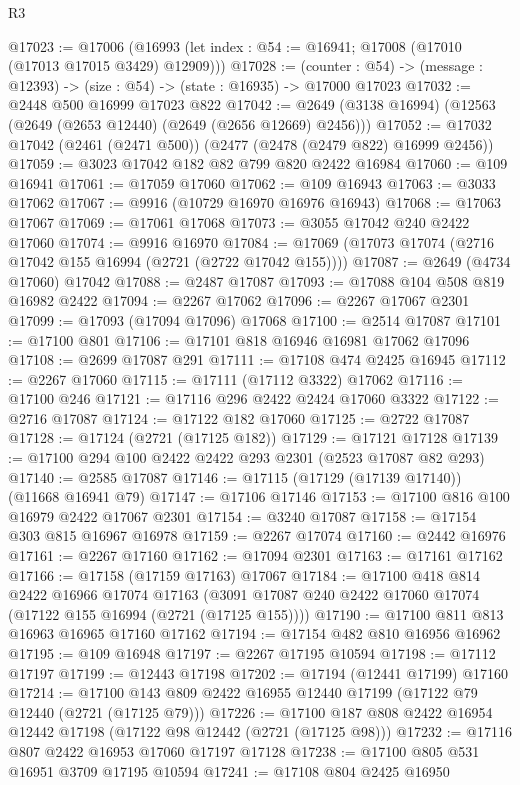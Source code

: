 \begin{lexlean}{R3}
\begin{coremodule}
@17023 := @17006 (@16993 (let index : @54 := @16941; @17008 (@17010 (@17013 @17015 @3429) @12909)))
@17028 := (counter : @54) -> (message : @12393) -> (size : @54) -> (state : @16935) -> @17000 @17023
@17032 := @2448 @500 @16999 @17023 @822
@17042 := @2649 (@3138 @16994) (@12563 (@2649 (@2653 @12440) (@2649 (@2656 @12669) @2456)))
@17052 := @17032 @17042 (@2461 (@2471 @500)) (@2477 (@2478 (@2479 @822) @16999 @2456))
@17059 := @3023 @17042 @182 @82 @799 @820 @2422 @16984
@17060 := @109 @16941
@17061 := @17059 @17060
@17062 := @109 @16943
@17063 := @3033 @17062
@17067 := @9916 (@10729 @16970 @16976 @16943)
@17068 := @17063 @17067
@17069 := @17061 @17068
@17073 := @3055 @17042 @240 @2422 @17060
@17074 := @9916 @16970
@17084 := @17069 (@17073 @17074 (@2716 @17042 @155 @16994 (@2721 (@2722 @17042 @155))))
@17087 := @2649 (@4734 @17060) @17042
@17088 := @2487 @17087
@17093 := @17088 @104 @508 @819 @16982 @2422
@17094 := @2267 @17062
@17096 := @2267 @17067 @2301
@17099 := @17093 (@17094 @17096) @17068
@17100 := @2514 @17087
@17101 := @17100 @801
@17106 := @17101 @818 @16946 @16981 @17062 @17096
@17108 := @2699 @17087 @291
@17111 := @17108 @474 @2425 @16945
@17112 := @2267 @17060
@17115 := @17111 (@17112 @3322) @17062
@17116 := @17100 @246
@17121 := @17116 @296 @2422 @2424 @17060 @3322
@17122 := @2716 @17087
@17124 := @17122 @182 @17060
@17125 := @2722 @17087
@17128 := @17124 (@2721 (@17125 @182))
@17129 := @17121 @17128
@17139 := @17100 @294 @100 @2422 @2422 @293 @2301 (@2523 @17087 @82 @293)
@17140 := @2585 @17087
@17146 := @17115 (@17129 (@17139 @17140)) (@11668 @16941 @79)
@17147 := @17106 @17146
@17153 := @17100 @816 @100 @16979 @2422 @17067 @2301
@17154 := @3240 @17087
@17158 := @17154 @303 @815 @16967 @16978
@17159 := @2267 @17074
@17160 := @2442 @16976
@17161 := @2267 @17160
@17162 := @17094 @2301
@17163 := @17161 @17162
@17166 := @17158 (@17159 @17163) @17067
@17184 := @17100
    @418
    @814
    @2422
    @16966
    @17074
    @17163
    (@3091 @17087 @240 @2422 @17060 @17074 (@17122 @155 @16994 (@2721 (@17125 @155))))
@17190 := @17100 @811 @813 @16963 @16965 @17160 @17162
@17194 := @17154 @482 @810 @16956 @16962
@17195 := @109 @16948
@17197 := @2267 @17195 @10594
@17198 := @17112 @17197
@17199 := @12443 @17198
@17202 := @17194 (@12441 @17199) @17160
@17214 := @17100 @143 @809 @2422 @16955 @12440 @17199 (@17122 @79 @12440 (@2721 (@17125 @79)))
@17226 := @17100 @187 @808 @2422 @16954 @12442 @17198 (@17122 @98 @12442 (@2721 (@17125 @98)))
@17232 := @17116 @807 @2422 @16953 @17060 @17197 @17128
@17238 := @17100 @805 @531 @16951 @3709 @17195 @10594
@17241 := @17108 @804 @2425 @16950

\end{coremodule}
\end{lexlean}
